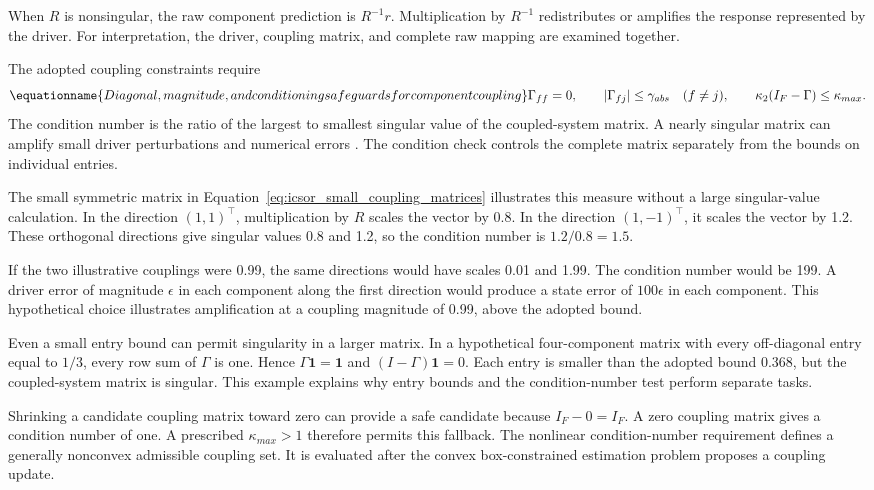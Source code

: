 When \(R\) is nonsingular, the raw component prediction is \(R^{-1}r\). Multiplication by \(R^{-1}\) redistributes or amplifies the response represented by the driver. For interpretation, the driver, coupling matrix, and complete raw mapping are examined together.

The adopted coupling constraints require
\begin{equation}
\equationname{Diagonal, magnitude, and conditioning safeguards for component coupling}
\label{eq:icsor_coupling_safeguards}
\Gamma_{ff}=0,
\qquad |\Gamma_{fj}|\leq\gamma_{abs}\quad(f\neq j),
\qquad \kappa_2(I_F-\Gamma)\leq\kappa_{max}.
\end{equation}
The condition number is the ratio of the largest to smallest singular value of the coupled-system matrix. A nearly singular matrix can amplify small driver perturbations and numerical errors \citep{BuzziFerraris2013}. The condition check controls the complete matrix separately from the bounds on individual entries.

The small symmetric matrix in Equation~\eqref{eq:icsor_small_coupling_matrices} illustrates this measure without a large singular-value calculation. In the direction \((1,1)^\top\), multiplication by \(R\) scales the vector by 0.8. In the direction \((1,-1)^\top\), it scales the vector by 1.2. These orthogonal directions give singular values 0.8 and 1.2, so the condition number is \(1.2/0.8=1.5\).

If the two illustrative couplings were 0.99, the same directions would have scales 0.01 and 1.99. The condition number would be 199. A driver error of magnitude \(\epsilon\) in each component along the first direction would produce a state error of \(100\epsilon\) in each component. This hypothetical choice illustrates amplification at a coupling magnitude of 0.99, above the adopted bound.

Even a small entry bound can permit singularity in a larger matrix. In a hypothetical four-component matrix with every off-diagonal entry equal to \(1/3\), every row sum of \(\Gamma\) is one. Hence \(\Gamma\mathbf{1}=\mathbf{1}\) and \((I-\Gamma)\mathbf{1}=0\). Each entry is smaller than the adopted bound 0.368, but the coupled-system matrix is singular. This example explains why entry bounds and the condition-number test perform separate tasks.

Shrinking a candidate coupling matrix toward zero can provide a safe candidate because \(I_F-0=I_F\). A zero coupling matrix gives a condition number of one. A prescribed \(\kappa_{max}>1\) therefore permits this fallback. The nonlinear condition-number requirement defines a generally nonconvex admissible coupling set. It is evaluated after the convex box-constrained estimation problem proposes a coupling update.

